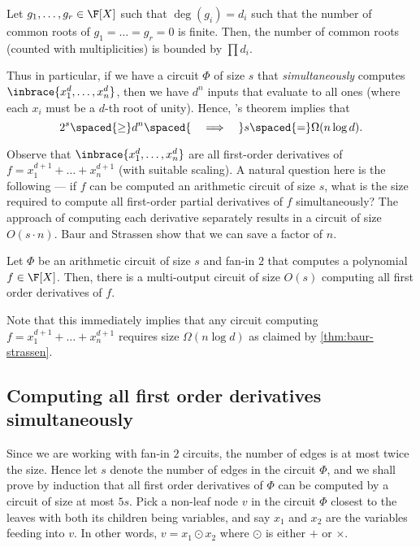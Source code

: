 \begin{theorem}
  Let $g_1,\dots, g_r \in \F[X]$ such that $\deg(g_i) = d_i$ such that the number of common roots of $g_1=\dots=g_r = 0$ is finite. 
Then, the number of common roots (counted with multiplicities) is bounded by $\prod d_i$.
\end{theorem}

Thus in particular, if we have a circuit $\Phi$ of size $s$ that \emph{simultaneously} computes $\inbrace{x_1^d, \dots,x_n^d}$, then we have $d^n$ inputs that evaluate to all ones (where each $x_i$ must be  a $d$-th root of unity). 
Hence, \Bezout's theorem implies that
$$
2^s\spaced{\geq} d^n \spaced{\quad\implies\quad} s \spaced{=} \Omega(n\log d).
$$

Observe that $\inbrace{x_1^d,\dots, x_n^d}$ are all first-order derivatives of $f = x_1^{d+1}+\dots+x_n^{d+1}$ (with suitable scaling). 
A natural question here is the following --- if $f$ can be computed an arithmetic circuit of size $s$, what is the size required to compute all first-order partial derivatives of $f$ simultaneously? 
The \naive approach of computing each derivative separately results in a circuit of size $O(s\cdot n)$. 
Baur and Strassen \cite{BS83} show that we can save a factor of $n$.

\begin{lemma}[\cite{BS83}]\label{lem:baur-strassen}
  Let $\Phi$ be an arithmetic circuit of size $s$ and fan-in $2$ that computes a polynomial $f\in \F[X]$. 
Then, there is a multi-output circuit  of size $O(s)$ computing all first order derivatives of $f$.
\end{lemma}

Note that this immediately implies that any circuit computing $f = x_1^{d+1} + \dots + x_n^{d+1}$ requires size $\Omega(n\log d)$ as claimed by \autoref{thm:baur-strassen}. 


\subsection{Computing all first order derivatives simultaneously}

Since we are working with fan-in $2$ circuits, the number of edges is at most twice the size. 
Hence let $s$ denote the number of edges in the circuit $\Phi$, and we shall prove by induction that all first order derivatives of $\Phi$ can be computed by a circuit of size at most $5s$. 
Pick a non-leaf node $v$ in the circuit $\Phi$ closest to the leaves with both its children being variables, and say $x_1$ and $x_2$ are the variables feeding into $v$. 
In other words, $v = x_1 \odot x_2$ where $\odot$ is either $+$ or $\times$.

